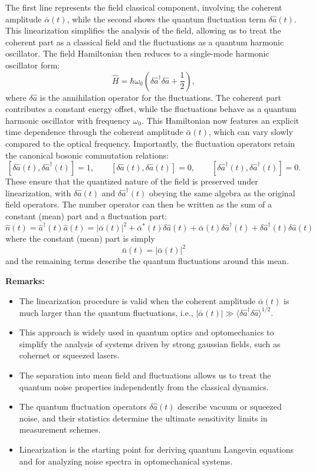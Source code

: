 The first line represents the field classical component, involving the coherent amplitude $\bar{\alpha}(t)$, while the second shows the quantum fluctuation term $\delta\hat{a}(t)$. This linearization simplifies the analysis of the field, allowing us to treat the coherent part as a classical field and the fluctuations as a quantum harmonic oscillator. The field Hamiltonian then reduces to a single-mode harmonic oscillator form:
\begin{equation}
\hat{H} = \hbar \omega_0 \left( \delta \hat{a}^\dagger \delta \hat{a} + \frac{1}{2} \right),
\end{equation}
where $\delta \hat{a}$ is the annihilation operator for the fluctuations. The coherent part contributes a constant energy offset, while the fluctuations behave as a quantum harmonic oscillator with frequency $\omega_0$. This Hamiltonian now features an explicit time dependence through the coherent amplitude $\bar{\alpha}(t)$, which can vary slowly compared to the optical frequency.
Importantly, the fluctuation operators retain the canonical bosonic commutation relations:
\[
[\delta \hat{a}(t), \delta \hat{a}^\dagger(t)] = 1, \qquad
[\delta \hat{a}(t), \delta \hat{a}(t)] = 0, \qquad
[\delta \hat{a}^\dagger(t), \delta \hat{a}^\dagger(t)] = 0.
\]
These ensure that the quantized nature of the field is preserved under linearization, with $\delta \hat{a}(t)$ and $\delta \hat{a}^\dagger(t)$ obeying the same algebra as the original field operators. The number operator can then be written as the sum of a constant (mean) part and a fluctuation part:
\begin{equation}
\hat{n}(t) = \hat{a}^\dagger(t)\hat{a}(t) = |\bar{\alpha}(t)|^2 + \bar{\alpha}^*(t)\delta\hat{a}(t) + \bar{\alpha}(t)\delta\hat{a}^\dagger(t) + \delta\hat{a}^\dagger(t)\delta\hat{a}(t)
\end{equation}
where the constant (mean) part is simply
\begin{equation}
\bar{n}(t) = |\bar{\alpha}(t)|^2
\end{equation}
and the remaining terms describe the quantum fluctuations around this mean.

\textbf{Remarks:} 
\begin{itemize}
  \item The linearization procedure is valid when the coherent amplitude $\bar{\alpha}(t)$ is much larger than the quantum fluctuations, i.e., $|\bar{\alpha}(t)| \gg \langle \delta\hat{a}^\dagger \delta\hat{a} \rangle^{1/2}$.
  \item This approach is widely used in quantum optics and optomechanics to simplify the analysis of systems driven by strong gaussian fields, such as cohernet or squeezed lasers.
  \item The separation into mean field and fluctuations allows us to treat the quantum noise properties independently from the classical dynamics.
  \item The quantum fluctuation operators $\delta\hat{a}(t)$ describe vacuum or squeezed noise, and their statistics determine the ultimate sensitivity limits in measurement schemes.
  \item Linearization is the starting point for deriving quantum Langevin equations and for analyzing noise spectra in optomechanical systems.
\end{itemize}
